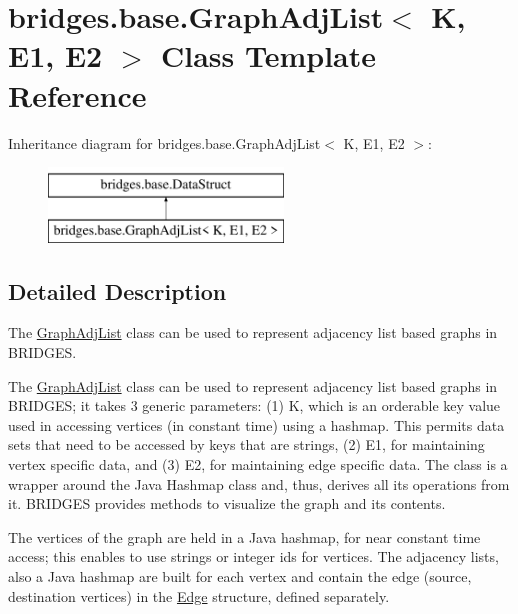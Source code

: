 \hypertarget{classbridges_1_1base_1_1_graph_adj_list}{}\section{bridges.\+base.\+Graph\+Adj\+List$<$ K, E1, E2 $>$ Class Template Reference}
\label{classbridges_1_1base_1_1_graph_adj_list}
Inheritance diagram for bridges.\+base.\+Graph\+Adj\+List$<$ K, E1, E2 $>$\+:\begin{figure}[H]
\begin{center}
\leavevmode
\includegraphics[height=2.000000cm]{classbridges_1_1base_1_1_graph_adj_list}
\end{center}
\end{figure}


\subsection{Detailed Description}
The \mbox{\hyperlink{classbridges_1_1base_1_1_graph_adj_list}{Graph\+Adj\+List}} class can be used to represent adjacency list based graphs in B\+R\+I\+D\+G\+ES. 

The \mbox{\hyperlink{classbridges_1_1base_1_1_graph_adj_list}{Graph\+Adj\+List}} class can be used to represent adjacency list based graphs in B\+R\+I\+D\+G\+ES; it takes 3 generic parameters\+: (1) K, which is an orderable key value used in accessing vertices (in constant time) using a hashmap. This permits data sets that need to be accessed by keys that are strings, (2) E1, for maintaining vertex specific data, and (3) E2, for maintaining edge specific data. The class is a wrapper around the Java Hashmap class and, thus, derives all its operations from it. B\+R\+I\+D\+G\+ES provides methods to visualize the graph and its contents.

The vertices of the graph are held in a Java hashmap, for near constant time access; this enables to use strings or integer ids for vertices. The adjacency lists, also a Java hashmap are built for each vertex and contain the edge (source, destination vertices) in the \mbox{\hyperlink{classbridges_1_1base_1_1_edge}{Edge}} structure, defined separately.


